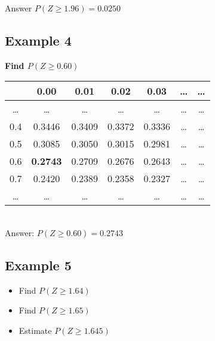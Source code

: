 Answer $P(Z \geq 1.96)  = 0.0250$

\newpage
\subsection*{Example 4}
\noindent \textbf{Find $ P(Z \geq 0.60)$}
{
\begin{table}[ht]
\centering %
\begin{tabular}{|c|| c c c c c c|} %
\hline %
& 0.00 & 0.01 & 0.02 &0.03&\ldots&\ldots \\
\hline \hline%
\ldots & \ldots &\ldots &\ldots& \ldots &\ldots&\ldots \\ %
0.4 & 0.3446 & 0.3409&0.3372 & 0.3336 &\ldots&\ldots\\
0.5 & 0.3085 & 0.3050 &0.3015& 0.2981 &\ldots&\dots \\ %
0.6 & \textbf{0.2743} & 0.2709&0.2676 & 0.2643 &\ldots&\ldots\\
0.7 & 0.2420 & 0.2389 &0.2358& 0.2327 &\ldots&\dots \\ %
\ldots & \ldots &\ldots &\ldots& \ldots &\ldots&\ldots \\ %
\hline %
\end{tabular}
\end{table}
} \\
\noindent Answer: $ P(Z \geq 0.60) = 0.2743$
\subsection*{Example 5}

\begin{itemize}
\item Find $ P(Z \geq 1.64)$
\item Find $ P(Z \geq 1.65)$
\item Estimate $P( Z \geq 1.645)$
\end{itemize}

